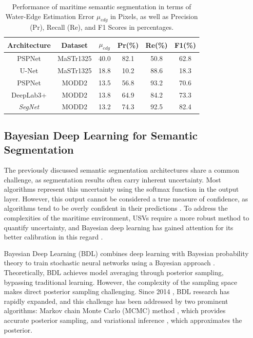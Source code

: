 \begin{table}[ht!]
    \centering
    \caption{Performance of maritime semantic segmentation in terms of Water-Edge Estimation Error $\mu_{edg}$ in Pixels, 
    as well as Precision (Pr), Recall (Re), and F1 Scores in percentages.}
    \label{tab:SS-compare}
    \begin{tabular}{c|c|c|c|c|c}
    \textbf{Architecture}        & \textbf{Dataset}           & \textbf{$\mu_{edg}$} & \textbf{Pr}(\%) & \textbf{Re}(\%) & \textbf{F1}(\%) \\ \hline
    PSPNet\cite{PSPNet}          & MaSTr1325\cite{MaSTr1325}  & 40.0 & 82.1 & 50.8 & 62.8 \\ \hline
    U-Net\cite{UNet}             & MaSTr1325\cite{MaSTr1325}  & 18.8 & 10.2 & 88.6 & 18.3 \\ \hline
    PSPNet\cite{PSPNet}          & MODD2\cite{MODD2}          & 13.5 & 56.8 & 93.2 & 70.6 \\ \hline
    DeepLab3+\cite{Deeplab3+}    & MODD2\cite{MODD2}          & 13.8 & 64.9 & 84.2 & 73.3 \\ \hline
    \textit{SegNet}\cite{SegNet} & MODD2\cite{MODD2}          & 13.2 & 74.3 & 92.5 & 82.4 \\ \hline
    \end{tabular}
\end{table}

\subsection{Bayesian Deep Learning for Semantic Segmentation}
The previously discussed semantic segmentation architectures share a common challenge, as segmentation results 
often carry inherent uncertainty. Most algorithms represent this uncertainty using the softmax function in the 
output layer. However, this output cannot be considered a true measure of confidence, as algorithms tend to be 
overly confident in their predictions \cite{overconfident}. To address the complexities of the maritime 
environment, USVs require a more robust method to quantify uncertainty, and Bayesian deep learning has gained 
attention for its better calibration in this regard \cite{bnn-tutorial}.

Bayesian Deep Learning (BDL) combines deep learning with Bayesian probability theory to train stochastic neural 
networks using a Bayesian approach \cite{bnn-tutorial}. Theoretically, BDL achieves model averaging through 
posterior sampling, bypassing traditional learning. However, the complexity of the sampling space makes direct 
posterior sampling challenging. Since 2014 \cite{bdl-history}, BDL research has rapidly expanded, and this 
challenge has been addressed by two prominent algorithms: Markov chain Monte Carlo (MCMC) method \cite{MCMC}, 
which provides accurate posterior sampling, and variational inference \cite{VI}, which approximates the posterior. 

